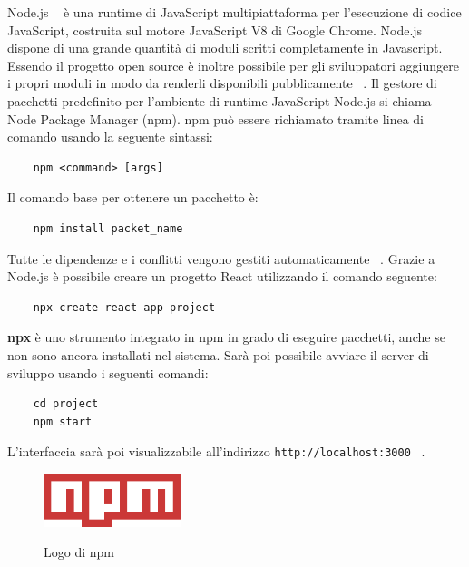 \noindent Node.js ~\cite{nodejs:online} è una runtime di JavaScript multipiattaforma per l'esecuzione di codice JavaScript, costruita sul motore JavaScript V8 di Google Chrome.\newline
Node.js dispone di una grande quantità di moduli scritti completamente in Javascript.
Essendo il progetto open source è inoltre possibile per gli sviluppatori aggiungere i propri moduli in modo da renderli disponibili pubblicamente ~\cite{nodejs:online}.\newline
\noindent Il gestore di pacchetti predefinito per l'ambiente di runtime JavaScript Node.js si chiama Node Package Manager (npm).
npm può essere richiamato tramite linea di comando usando la seguente sintassi:
\begin{verbatim}
    npm <command> [args]
\end{verbatim}
Il comando base per ottenere un pacchetto è:
\begin{verbatim}
    npm install packet_name
\end{verbatim}
Tutte le dipendenze e i conflitti vengono gestiti automaticamente ~\cite{npmDo:online}.
\newline Grazie a Node.js è possibile creare un progetto React utilizzando il comando seguente:
\begin{verbatim}
    npx create-react-app project
\end{verbatim}
\textbf{npx} è uno strumento integrato in npm in grado di eseguire pacchetti, anche se non sono ancora installati nel sistema.\newline
Sarà poi possibile avviare il server di sviluppo usando i seguenti comandi:
\begin{verbatim}
    cd project
    npm start
\end{verbatim}
L'interfaccia sarà poi visualizzabile all'indirizzo \texttt{http://localhost:3000} ~\cite{PrimiPas97:online}.

\begin{figure}[H]
    \caption{Logo di npm ~\cite{npm:online}}
    \centering
    \includegraphics[width=40mm]{img/logos/npm_logo.png}
    \label{fig:npm_logo}
\end{figure}

